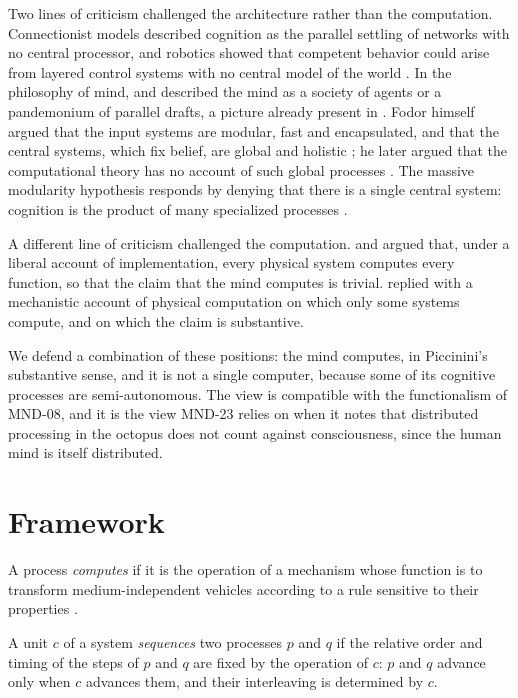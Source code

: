 \documentclass{situationist-preprint}
\begin{document}
Two lines of criticism challenged the architecture rather than the computation. Connectionist models \citep{RumelhartMcClelland1986} described cognition as the parallel settling of networks with no central processor, and robotics showed that competent behavior could arise from layered control systems with no central model of the world \citep{Brooks1991}. In the philosophy of mind, \citet{Minsky1986} and \citet{Dennett1991} described the mind as a society of agents or a pandemonium of parallel drafts, a picture already present in \citet{Selfridge1959}. Fodor himself argued that the input systems are modular, fast and encapsulated, and that the central systems, which fix belief, are global and holistic \citep{Fodor1983}; he later argued that the computational theory has no account of such global processes \citep{Fodor2000}. The massive modularity hypothesis responds by denying that there is a single central system: cognition is the product of many specialized processes \citep{Carruthers2006}.

A different line of criticism challenged the computation. \citet{Searle1992} and \citet{Putnam1988} argued that, under a liberal account of implementation, every physical system computes every function, so that the claim that the mind computes is trivial. \citet{Piccinini2015} replied with a mechanistic account of physical computation on which only some systems compute, and on which the claim is substantive.

We defend a combination of these positions: the mind computes, in Piccinini's substantive sense, and it is not a single computer, because some of its cognitive processes are semi-autonomous. The view is compatible with the functionalism of MND-08, and it is the view MND-23 relies on when it notes that distributed processing in the octopus does not count against consciousness, since the human mind is itself distributed.

\section{Framework}

\begin{definition}\label{d:comp}
A process \emph{computes} if it is the operation of a mechanism whose function is to transform medium-independent vehicles according to a rule sensitive to their properties \citep{Piccinini2015}.
\end{definition}

\begin{definition}[Sequencing]\label{d:seq}
A unit $c$ of a system \emph{sequences} two processes $p$ and $q$ if the relative order and timing of the steps of $p$ and $q$ are fixed by the operation of $c$: $p$ and $q$ advance only when $c$ advances them, and their interleaving is determined by $c$.
\end{definition}
\end{document}
